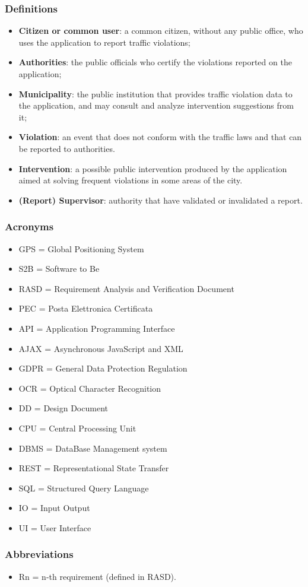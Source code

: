 \subsubsection{Definitions}
\begin{itemize}
	\item \textbf{Citizen or common user}: a common citizen, without any public office, who uses the application to report traffic violations;
	\item \textbf{Authorities}: the public officials who certify the violations reported on the application;
	\item \textbf{Municipality}: the public institution that provides traffic violation data to the application, and may consult and analyze intervention suggestions from it;
	\item \textbf{Violation}: an event that does not conform with the traffic laws and that can be reported to authorities.
	\item \textbf{Intervention}: a possible public intervention produced by the application aimed at solving frequent violations in some areas of the city.
	\item \textbf{(Report) Supervisor}: authority that have validated or invalidated a report.
\end{itemize}
\subsubsection{Acronyms}
\begin{itemize}
	\item GPS = Global Positioning System
	\item S2B = Software to Be
	\item RASD = Requirement Analysis and Verification Document
	\item PEC = Posta Elettronica Certificata
	\item API = Application Programming Interface
	\item AJAX = Asynchronous JavaScript and XML
	\item GDPR = General Data Protection Regulation
	\item OCR = Optical Character Recognition
	\item DD = Design Document
	\item CPU = Central Processing Unit
	\item DBMS = DataBase Management system
	\item REST = Representational State Transfer
	\item SQL = Structured Query Language
	\item IO = Input Output
	\item UI = User Interface
\end{itemize}
\subsubsection{Abbreviations}
\begin{itemize}
	\item Rn = n-th requirement (defined in RASD).
\end{itemize}